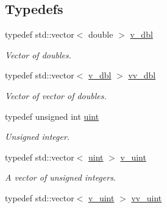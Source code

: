 \subsection*{Typedefs}
\begin{DoxyCompactItemize}
\item 
\mbox{\label{namespacepruner_a44842dd002b20706deed84d8e317d546}} 
typedef std\+::vector$<$ double $>$ \hyperlink{namespacepruner_a44842dd002b20706deed84d8e317d546}{v\+\_\+dbl}
\begin{DoxyCompactList}\small\item\em Vector of doubles. \end{DoxyCompactList}\item 
\mbox{\label{namespacepruner_a2f2b147cbaa63e2687ee9ae0cb94fea7}} 
typedef std\+::vector$<$ \hyperlink{namespacepruner_a44842dd002b20706deed84d8e317d546}{v\+\_\+dbl} $>$ \hyperlink{namespacepruner_a2f2b147cbaa63e2687ee9ae0cb94fea7}{vv\+\_\+dbl}
\begin{DoxyCompactList}\small\item\em Vector of vector of doubles. \end{DoxyCompactList}\item 
\mbox{\label{namespacepruner_a659e6e64a9e2b8e981c3d34262a2f67e}} 
typedef unsigned int \hyperlink{namespacepruner_a659e6e64a9e2b8e981c3d34262a2f67e}{uint}
\begin{DoxyCompactList}\small\item\em Unsigned integer. \end{DoxyCompactList}\item 
\mbox{\label{namespacepruner_af0145646bd7ede012cd336b416bc5579}} 
typedef std\+::vector$<$ \hyperlink{namespacepruner_a659e6e64a9e2b8e981c3d34262a2f67e}{uint} $>$ \hyperlink{namespacepruner_af0145646bd7ede012cd336b416bc5579}{v\+\_\+uint}
\begin{DoxyCompactList}\small\item\em A vector of unsigned integers. \end{DoxyCompactList}\item 
\mbox{\label{namespacepruner_acc0badaa0c5a170f5f93cfc20ec428a2}} 
typedef std\+::vector$<$ \hyperlink{namespacepruner_af0145646bd7ede012cd336b416bc5579}{v\+\_\+uint} $>$ \hyperlink{namespacepruner_acc0badaa0c5a170f5f93cfc20ec428a2}{vv\+\_\+uint}

\end{DoxyCompactItemize}
